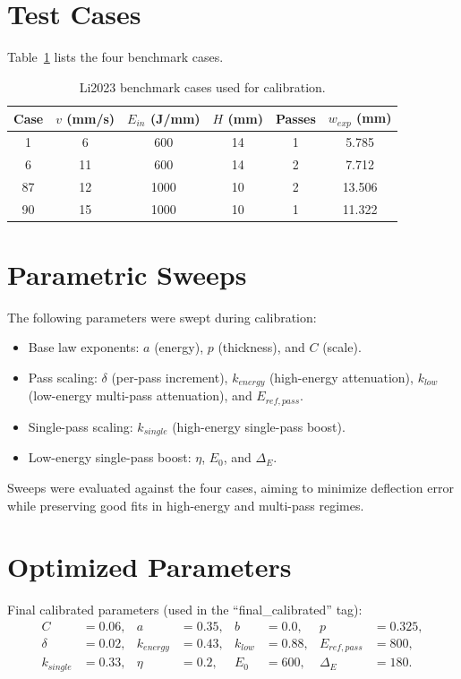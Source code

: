 \documentclass[11pt]{article}
\begin{document}
\section{Test Cases}
Table~\ref{tab:cases} lists the four benchmark cases.
\begin{table}[h]
\centering
\begin{tabular}{cccccc}
\toprule
Case & $v$ (mm/s) & $E_{in}$ (J/mm) & $H$ (mm) & Passes & $w_{exp}$ (mm) \\
\midrule
1  & 6  & 600  & 14 & 1 & 5.785 \\
6  & 11 & 600  & 14 & 2 & 7.712 \\
87 & 12 & 1000 & 10 & 2 & 13.506 \\
90 & 15 & 1000 & 10 & 1 & 11.322 \\
\bottomrule
\end{tabular}
\caption{Li2023 benchmark cases used for calibration.}
\label{tab:cases}
\end{table}

\section{Parametric Sweeps}
The following parameters were swept during calibration:
\begin{itemize}
  \item Base law exponents: $a$ (energy), $p$ (thickness), and $C$ (scale).
  \item Pass scaling: $\delta$ (per-pass increment), $k_{energy}$ (high-energy attenuation),
        $k_{low}$ (low-energy multi-pass attenuation), and $E_{ref,pass}$.
  \item Single-pass scaling: $k_{single}$ (high-energy single-pass boost).
  \item Low-energy single-pass boost: $\eta$, $E_0$, and $\Delta_E$.
\end{itemize}
Sweeps were evaluated against the four cases, aiming to minimize deflection error while
preserving good fits in high-energy and multi-pass regimes.

\section{Optimized Parameters}
Final calibrated parameters (used in the ``final\_calibrated'' tag):
\begin{align*}
C &= 0.06, & a &= 0.35, & b &= 0.0, & p &= 0.325, \\
\delta &= 0.02, & k_{energy} &= 0.43, & k_{low} &= 0.88, & E_{ref,pass} &= 800, \\
k_{single} &= 0.33, & \eta &= 0.2, & E_0 &= 600, & \Delta_E &= 180.
\end{align*}
\end{document}
